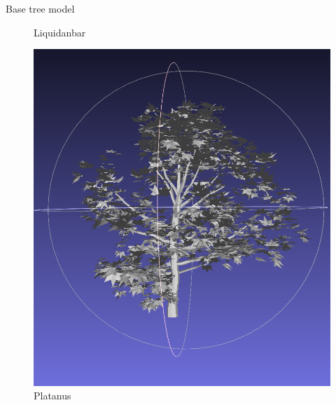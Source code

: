 \documentclass[10pt]{beamer}
\begin{document}
\begin{frame}{Base tree model}
\begin{figure}[H]
\begin{minipage}{0.24\textwidth}
        \caption{Liquidanbar}
    \end{minipage}\hfill
    \begin{minipage}{0.24\textwidth}
        \centering
        \includegraphics[width=\textwidth]{images/platanus.png}
        \caption{Platanus}
    \end{minipage}\hfill
    \begin{minipage}{0.24\textwidth}
        \centering

\end{minipage}
\end{figure}
\end{frame}
\end{document}
